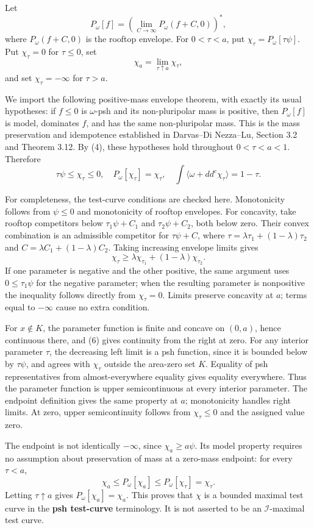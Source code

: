 \documentclass[
]{article}
\begin{document}
Let \[
 P_\omega[f]=\left(\lim_{C\to\infty}P_\omega(f+C,0)\right)^*,
\] where \(P_\omega(f+C,0)\) is the rooftop envelope. For \(0<\tau<a\),
put \(\chi_\tau=P_\omega[\tau\psi]\). Put \(\chi_\tau=0\) for
\(\tau\leq0\), set \[
 \chi_a=\lim_{\tau\uparrow a}\chi_\tau,
\] and set \(\chi_\tau=-\infty\) for \(\tau>a\).

We import the following positive-mass envelope theorem, with exactly its
usual hypotheses: if \(f\leq0\) is \(\omega\)-psh and its non-pluripolar
mass is positive, then \(P_\omega[f]\) is model, dominates \(f\), and
has the same non-pluripolar mass. This is the mass preservation and
idempotence established in Darvas--Di Nezza--Lu, Section 3.2 and Theorem
3.12. By (4), these hypotheses hold throughout \(0<\tau<a<1\). Therefore
\[
 \tau\psi\leq\chi_\tau\leq0,\quad
 P_\omega[\chi_\tau]=\chi_\tau,\quad
 \int\langle\omega+dd^c\chi_\tau\rangle=1-\tau.
 \tag{6}
\]

For completeness, the test-curve conditions are checked here.
Monotonicity follows from \(\psi\leq0\) and monotonicity of rooftop
envelopes. For concavity, take rooftop competitors below
\(\tau_1\psi+C_1\) and \(\tau_2\psi+C_2\), both below zero. Their convex
combination is an admissible competitor for \(\tau\psi+C\), where
\(\tau=\lambda\tau_1+(1-\lambda)\tau_2\) and
\(C=\lambda C_1+(1-\lambda)C_2\). Taking increasing envelope limits
gives \[
 \chi_\tau\geq\lambda\chi_{\tau_1}+(1-\lambda)\chi_{\tau_2}.
\] If one parameter is negative and the other positive, the same
argument uses \(0\leq\tau_1\psi\) for the negative parameter; when the
resulting parameter is nonpositive the inequality follows directly from
\(\chi_\tau=0\). Limits preserve concavity at \(a\); terms equal to
\(-\infty\) cause no extra condition.

For \(x\notin K\), the parameter function is finite and concave on
\((0,a)\), hence continuous there, and (6) gives continuity from the
right at zero. For any interior parameter \(\tau\), the decreasing left
limit is a psh function, since it is bounded below by \(\tau\psi\), and
agrees with \(\chi_\tau\) outside the area-zero set \(K\). Equality of
psh representatives from almost-everywhere equality gives equality
everywhere. Thus the parameter function is upper semicontinuous at every
interior parameter. The endpoint definition gives the same property at
\(a\); monotonicity handles right limits. At zero, upper semicontinuity
follows from \(\chi_\tau\leq0\) and the assigned value zero.

The endpoint is not identically \(-\infty\), since \(\chi_a\geq a\psi\).
Its model property requires no assumption about preservation of mass at
a zero-mass endpoint: for every \(\tau<a\), \[
 \chi_a\leq P_\omega[\chi_a]\leq P_\omega[\chi_\tau]=\chi_\tau.
\] Letting \(\tau\uparrow a\) gives \(P_\omega[\chi_a]=\chi_a\). This
proves that \(\chi\) is a bounded maximal test curve in the \textbf{psh
test-curve} terminology. It is not asserted to be an
\(\mathcal I\)-maximal test curve.
\end{document}
